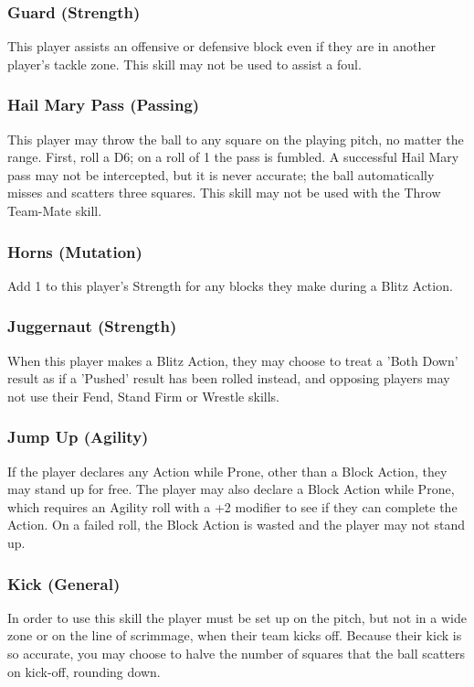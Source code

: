 \begin{multicols}{3}
\subsubsection{Guard (Strength)}
\par This player assists an offensive or defensive block even if they are in another player's tackle zone. This skill may not be used to assist a foul.

\subsubsection{Hail Mary Pass (Passing)}
\par This player may throw the ball to any square on the playing pitch, no matter the range. First, roll a D6; on a roll of 1 the pass is fumbled. A successful Hail Mary pass may not be intercepted, but it is never accurate; the ball automatically misses and scatters three squares. This skill may not be used with the Throw Team-Mate skill.

\subsubsection{Horns (Mutation)}
\par Add 1 to this player's Strength for any blocks they make during a Blitz Action.

\subsubsection{Juggernaut (Strength)}
\par When this player makes a Blitz Action, they may choose to treat a 'Both Down' result as if a 'Pushed' result has been rolled instead, and opposing players may not use their Fend, Stand Firm or Wrestle skills.

\subsubsection{Jump Up (Agility)}
\par If the player declares any Action while Prone, other than a Block Action, they may stand up for free. The player may also declare a Block Action while Prone, which requires an Agility roll with a +2 modifier to see if they can complete the Action. On a failed roll, the Block Action is wasted and the player may not stand up.

\subsubsection{Kick (General)}
\par In order to use this skill the player must be set up on the pitch, but not in a wide zone or on the line of scrimmage, when their team kicks off. Because their kick is so accurate, you may choose to halve the number of squares that the ball scatters on kick-off, rounding down.


\end{multicols}
